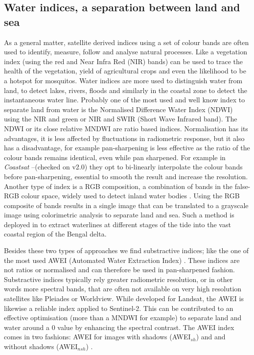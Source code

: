 \documentclass[remotesensing,article,submit,pdftex,moreauthors]{Definitions/mdpi}
\begin{document}
\subsection{Water indices, a separation between land and sea}
As a general matter, satellite derived indices using a set of colour bands are often used to identify, measure, follow and analyse natural processes. Like a vegetation index (using the red and Near Infra Red (NIR) bands) can be used to trace the health of the vegetation, yield of agricultural crops and even the likelihood to be a hotspot for mosquitos. Water indices are more used to distinguish water from land, to detect lakes, rivers, floods and similarly in the coastal zone to detect the instantaneous water line. Probably one of the most used and well know index to separate land from water is the Normalised Difference Water Index (NDWI) using the NIR and green or NIR and SWIR (Short Wave Infrared band). The NDWI or its close relative MNDWI are ratio based indices. Normalisation has its advantages, it is less affected by fluctuations in radiometric response, but it also has a disadvantage, for example pan-sharpening is less effective as the ratio of the colour bands remains identical, even while pan sharpened. For example in \textit{Coastsat} --(checked on v2.0) they opt to bi-linearly interpolate the colour bands before pan-sharpening, essential to smooth the result and increase the resolution. Another type of index is a RGB composition, a combination of bands in the false-RGB colour space, widely used to detect inland water bodies \citep{PEKEL2014704}. Using the RGB composite of bands results in a single image that can be translated to a grayscale image using colorimetric analysis to separate land and sea. Such a method is deployed in \citet{Khan2019} to extract waterlines at different stages of the tide into the vast coastal region of the Bengal delta. 

Besides these two types of approaches we find substractive indices; like the one of the most used AWEI (Automated Water Extraction Index) \citep{FEYISA201423}. These indices are not ratios or normalised and can therefore be used in pan-sharpened fashion. Substractive indices typically rely greater radiometric resolution, or in other words more spectral bands, that are often not available on very high resolution satellites like Pleiades or Worldview. While developed for Landsat, the AWEI is likewise a reliable index applied to Sentinel-2. This can be contributed to an effective optimisation (more than a MNDWI for example) to separate land and water around a 0 value by enhancing the spectral contrast. The AWEI index comes in two fashions: AWEI for images with shadows (AWEI$_{sh}$) and and without shadows (AWEI$_{nsh}$) \citep{FEYISA201423}.
\end{document}
